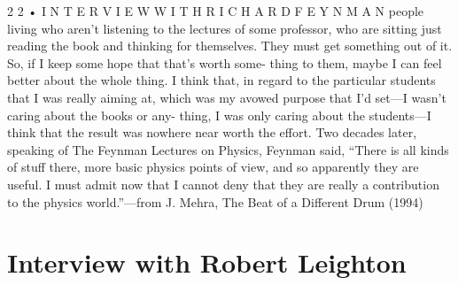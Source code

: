 \documentclass[11pt,oneside]{article}
\begin{document}
2 2 • I N T E R V I E W  W I T H  R I C H A R D  F E Y N M A N people living who aren’t listening to the lectures of some professor, who are sitting just reading the book and thinking for themselves. They must get something out of it. So, if I keep some hope that that’s worth some- thing to them, maybe I can feel better about the whole thing. I think that, in regard to the particular students that I was really aiming at, which was my avowed purpose that I’d set---I wasn’t caring about the books or any- thing, I was only caring about the students---I think that the result was nowhere near worth the effort.\emph{ } Two decades later, speaking of The Feynman Lectures on Physics, Feynman said, “There is all kinds of stuff there, more basic physics points of view, and so apparently they are useful. I must admit now that I cannot deny that they are really a contribution to the physics world.”---from J. Mehra, The Beat of a Different Drum (1994)\par



\clearpage


\section*{Interview with Robert Leighton}



\label{tips-sec-7-interview-with-robert-leighton}

\end{document}
